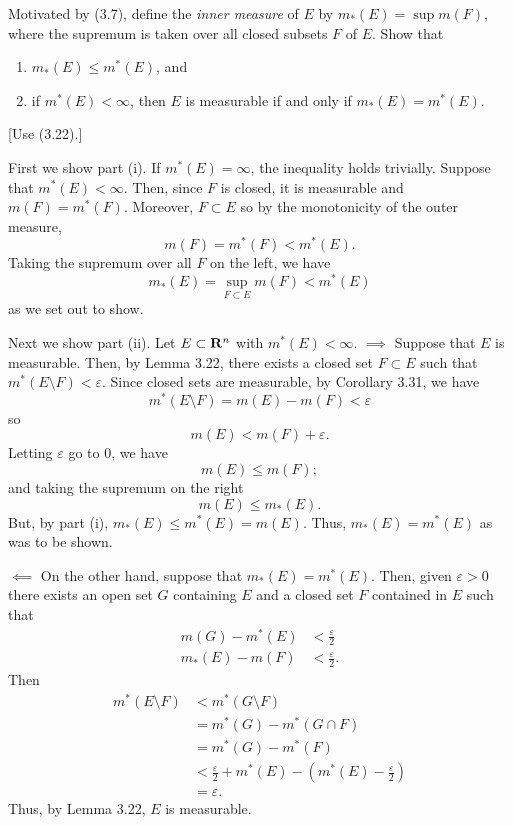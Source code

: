 \begin{problem}
  Motivated by (3.7), define the \emph{inner measure} of $E$ by
  $m_*(E)=\sup m(F)$, where the supremum is taken over all closed subsets
  $F$ of $E$. Show that
  \begin{enumerate}[label=(\roman*),noitemsep]
  \item $m_*(E)\leq m^*(E)$, and
  \item if $m^*(E)<\infty$, then $E$ is measurable if and only if
    $m_*(E)=m^*(E)$.
  \end{enumerate} [Use (3.22).]
\end{problem}
\begin{solution}
  First we show part (i). If $m^*(E)=\infty$, the inequality holds
  trivially. Suppose that $m^*(E)<\infty$. Then, since $F$ is closed, it is
  measurable and $m(F)=m^*(F)$. Moreover, $F\subset E$ so by the
  monotonicity of the outer measure,
  \[
    m(F)=m^*(F)<m^*(E).
  \]
  Taking the supremum over all $F$ on the left, we have
  \[
    m_*(E)=\sup_{F\subset E}m(F)<m^*(E)
  \]
  as we set out to show.

  Next we show part (ii). Let $E\subset\mathbf{R}^n$ with
  $m^*(E)<\infty$. $\implies$ Suppose that $E$ is measurable. Then, by
  Lemma 3.22, there exists a closed set $F\subset E$ such that
  $m^*(E\setminus F)<\varepsilon$. Since closed sets are measurable,
  by Corollary 3.31, we have
  \[
    m^*(E\setminus F)=m(E)-m(F)<\varepsilon
  \]
  so
  \[
    m(E)<m(F)+\varepsilon.
  \]
  Letting $\varepsilon$ go to $0$, we have
  \[
    m(E)\leq m(F);
  \]
  and taking the supremum on the right
  \[
    m(E)\leq m_*(E).
  \]
  But, by part (i), $m_*(E)\leq m^*(E)=m(E)$. Thus, $m_*(E)=m^*(E)$ as was
  to be shown.

  $\impliedby$ On the other hand, suppose that $m_*(E)=m^*(E)$. Then, given
  $\varepsilon>0$ there exists an open set $G$ containing $E$ and a closed
  set $F$ contained in $E$ such that
  \begin{align*}
    m(G)-m^*(E)&<\frac{\varepsilon}{2}\\
    m_*(E)-m(F)&<\frac{\varepsilon}{2}.
  \end{align*}
  Then
  \begin{align*}
    m^*(E\setminus F)
    &<m^*(G\setminus F)\\
    &=m^*(G)-m^*(G\cap F)\\
    &=m^*(G)-m^*(F)\\
    &<\frac{\varepsilon}{2}+m^*(E)-\left(m^*(E)-\frac{\varepsilon}{2}\right)\\
    &=\varepsilon.
  \end{align*}
  Thus, by Lemma 3.22, $E$ is measurable.
\end{solution}


